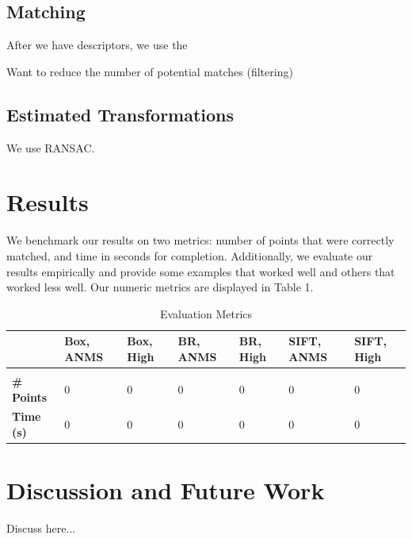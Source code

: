 \documentclass[12pt]{article}
\begin{document}
\subsection*{Matching}
After we have descriptors, we use the 

Want to reduce the number of potential matches (filtering)

\subsection*{Estimated Transformations}
We use RANSAC.

\section*{Results}

We benchmark our results on two metrics: number of points that were correctly matched, and time in seconds for completion. Additionally, we evaluate our results empirically and provide some examples that worked well and others that worked less well. Our numeric metrics are displayed in Table 1. 

\begin{table}[t]
\caption{Evaluation Metrics}
\label{sparsesvd}
\begin{center}
\begin{tabular}{l|llllll}
\multicolumn{1}{l}{} & \multicolumn{1}{l}{\bf Box, ANMS} & \multicolumn{1}{l}{\bf Box, High} & \multicolumn{1}{l}{\bf BR, ANMS} & \multicolumn{1}{l}{\bf BR, High} & \multicolumn{1}{l}{\bf SIFT, ANMS} & \multicolumn{1}{l}{\bf SIFT, High}
\\ \hline \\
{\bf \# Points} & 0 & 0 & 0 & 0 & 0 & 0 \\
{\bf Time (s)} & 0 & 0 & 0 & 0 & 0 & 0 \\
\end{tabular}
\end{center}
\end{table}

\section*{Discussion and Future Work}

Discuss here...

\end{document}
